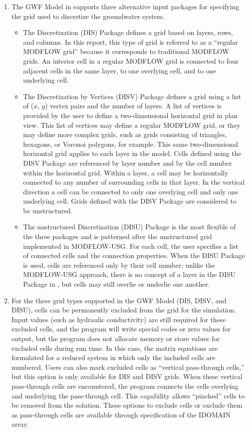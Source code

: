 \begin{enumerate}

\item The GWF Model in \mf supports three alternative input packages for specifying the grid used to discretize the groundwater system.  
\begin{itemize}
\item The Discretization (DIS) Package defines a grid based on layers, rows, and columns.  In this report, this type of grid is referred to as a ``regular MODFLOW grid'' because it corresponds to traditional MODFLOW grids.  An interior cell in a regular MODFLOW grid is connected to four adjacent cells in the same layer, to one overlying cell, and to one underlying cell.
\item The Discretization by Vertices (DISV) Package defines a grid using a list of ($x$, $y$) vertex pairs and the number of layers.  A list of vertices is provided by the user to define a two-dimensional horizontal grid in plan view.  This list of vertices may define a regular MODFLOW grid, or they may define more complex grids, such as grids consisting of triangles, hexagons, or Voronoi polygons, for example.  This same two-dimensional horizontal grid applies to each layer in the model.  Cells defined using the DISV Package are referenced by layer number and by the cell number within the horizontal grid.  Within a layer, a cell may be horizontally connected to any number of surrounding cells in that layer.  In the vertical direction a cell can be connected to only one overlying cell and only one underlying cell.  Grids defined with the DISV Package are considered to be unstructured.
\item The unstructured Discretization (DISU) Package is the most flexible of the three packages and is patterned after the unstructured grid implemented in MODFLOW-USG.  For each cell, the user specifies a list of connected cells and the connection properties.  When the DISU Package is used, cells are referenced only by their cell number; unlike the MODFLOW-USG approach, there is no concept of a layer in the DISU Package in \mf, but cells may still overlie or underlie one another.  
\end{itemize}

\item For the three grid types supported in the GWF Model (DIS, DISV, and DISU), cells can be permanently excluded from the grid for the simulation.  Input values (such as hydraulic conductivity) are still required for these excluded cells, and the program will write special codes or zero values for output, but the program does not allocate memory or store values for excluded cells during run time.  In this case, the matrix equations are formulated for a reduced system in which only the included cells are numbered.  Users can also mark excluded cells as ``vertical pass-through cells,'' but this option is only available for DIS and DISV grids.  When these vertical pass-through cells are encountered, the program connects the cells overlying and underlying the pass-through cell.  This capability allows ``pinched'' cells to be removed from the solution.  These options to exclude cells or exclude them as pass-through cells are available through specification of the IDOMAIN array.


\end{enumerate}
